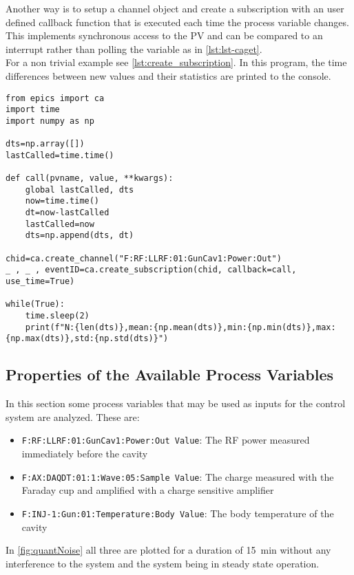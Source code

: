 Another way is to setup a channel object and create a subscription with an user defined callback function that is executed each time the process variable changes. This implements synchronous access to the PV and can be compared to an interrupt rather than polling the variable as in \autoref{lst:lst-caget}.\\
For a non trivial example see \autoref{lst:create_subscription}. In this program, the time differences between new values and their statistics are printed to the console.

\begin{lstlisting}[style=python,caption = Using a user defined callback function to access an EPICS process value, label = lst:create_subscription]
from epics import ca
import time
import numpy as np

dts=np.array([])
lastCalled=time.time()

def call(pvname, value, **kwargs):
	global lastCalled, dts
	now=time.time()
	dt=now-lastCalled
	lastCalled=now
	dts=np.append(dts, dt)

chid=ca.create_channel("F:RF:LLRF:01:GunCav1:Power:Out")
_ , _ , eventID=ca.create_subscription(chid, callback=call, use_time=True)

while(True):
	time.sleep(2)
	print(f"N:{len(dts)},mean:{np.mean(dts)},min:{np.min(dts)},max:{np.max(dts)},std:{np.std(dts)}")
\end{lstlisting}




\subsection{Properties of the Available Process Variables}
In this section some process variables that may be used as inputs for the control system are analyzed. These are:
\begin{itemize}
\item \texttt{F:RF:LLRF:01:GunCav1:Power:Out Value}: The RF power measured immediately before the cavity
\item \texttt{F:AX:DAQDT:01:1:Wave:05:Sample Value}: The charge measured with the Faraday cup and amplified with a charge sensitive amplifier
\item \texttt{F:INJ-1:Gun:01:Temperature:Body Value}: The body temperature of the cavity
\end{itemize}

In \autoref{fig:quantNoise} all three are plotted for a duration of \SI{15}{\minute} without any interference to the system and the system being in steady state operation.

